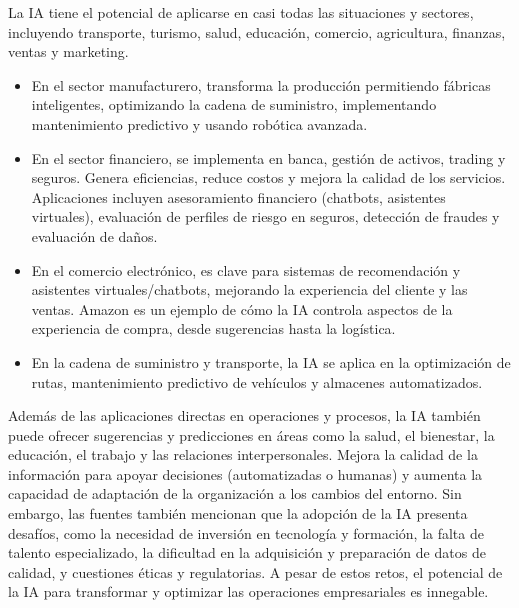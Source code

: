 \documentclass[12pt, a4paper, twoside]{article}
\begin{document}
La IA tiene el potencial de aplicarse en casi todas las situaciones y sectores, incluyendo transporte, turismo, salud, educación, comercio, agricultura, finanzas, ventas y marketing.

\begin{itemize}
    \item En el sector manufacturero, transforma la producción permitiendo fábricas inteligentes, optimizando la cadena de suministro, implementando mantenimiento predictivo y usando robótica avanzada.
    \item En el sector financiero, se implementa en banca, gestión de activos, trading y seguros. Genera eficiencias, reduce costos y mejora la calidad de los servicios. Aplicaciones incluyen asesoramiento financiero (chatbots, asistentes virtuales), evaluación de perfiles de riesgo en seguros, detección de fraudes y evaluación de daños.
    \item En el comercio electrónico, es clave para sistemas de recomendación y asistentes virtuales/chatbots, mejorando la experiencia del cliente y las ventas. Amazon es un ejemplo de cómo la IA controla aspectos de la experiencia de compra, desde sugerencias hasta la logística.
    \item En la cadena de suministro y transporte, la IA se aplica en la optimización de rutas, mantenimiento predictivo de vehículos y almacenes automatizados.
\end{itemize}

Además de las aplicaciones directas en operaciones y procesos, la IA también puede ofrecer sugerencias y predicciones en áreas como la salud, el bienestar, la educación, el trabajo y las relaciones interpersonales. Mejora la calidad de la información para apoyar decisiones (automatizadas o humanas) y aumenta la capacidad de adaptación de la organización a los cambios del entorno.
Sin embargo, las fuentes también mencionan que la adopción de la IA presenta desafíos, como la necesidad de inversión en tecnología y formación, la falta de talento especializado, la dificultad en la adquisición y preparación de datos de calidad, y cuestiones éticas y regulatorias. A pesar de estos retos, el potencial de la IA para transformar y optimizar las operaciones empresariales es innegable.
\end{document}

